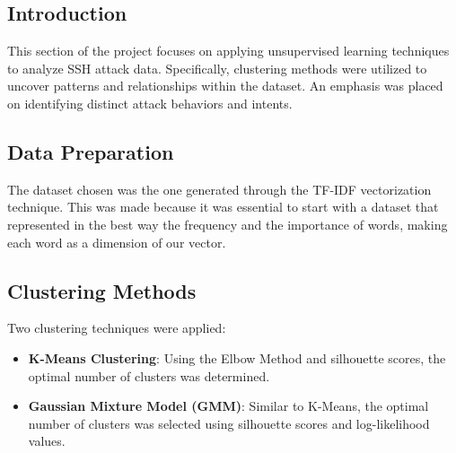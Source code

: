 


\subsection*{Introduction}
This section of the project focuses on applying unsupervised learning techniques to analyze SSH attack data. Specifically, clustering methods were utilized to uncover patterns and relationships within the dataset. An emphasis was placed on identifying distinct attack behaviors and intents.

\subsection*{Data Preparation}
The dataset chosen was the one generated through the TF-IDF vectorization technique. This was made because it was essential to start with a dataset that represented in the best way the frequency and the importance of words, making each word as a dimension of our vector.

\subsection*{Clustering Methods}
Two clustering techniques were applied:
\begin{itemize}
    \item \textbf{K-Means Clustering}: Using the Elbow Method and silhouette scores, the optimal number of clusters was determined.
    \item \textbf{Gaussian Mixture Model (GMM)}: Similar to K-Means, the optimal number of clusters was selected using silhouette scores and log-likelihood values.
\end{itemize}

